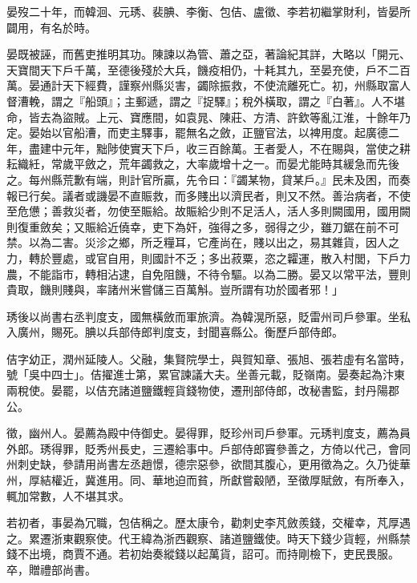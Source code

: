 \begin{pinyinscope}
 晏歿二十年，而韓洄、元琇、裴腆、李衡、包佶、盧徵、李若初繼掌財利，皆晏所闢用，有名於時。



 晏既被誣，而舊吏推明其功。陳諫以為管、蕭之亞，著論紀其詳，大略以「開元、天寶間天下戶千萬，至德後殘於大兵，饑疫相仍，十耗其九，至晏充使，戶不二百萬。晏通計天下經費，謹察州縣災害，蠲除振救，不使流離死亡。初，州縣取富人督漕輓，謂之『船頭』；主郵遞，謂之『捉驛』；稅外橫取，謂之『白著』。人不堪命，皆去為盜賊。上元、寶應間，如袁晁、陳莊、方清、許欽等亂江淮，十餘年乃定。晏始以官船漕，而吏主驛事，罷無名之斂，正鹽官法，以裨用度。起廣德二年，盡建中元年，黜陟使實天下戶，收三百餘萬。王者愛人，不在賜與，當使之耕耘織紝，常歲平斂之，荒年蠲救之，大率歲增十之一。而晏尤能時其緩急而先後之。每州縣荒歉有端，則計官所贏，先令曰：『蠲某物，貸某戶。』民未及困，而奏報已行矣。議者或譏晏不直賑救，而多賤出以濟民者，則又不然。善治病者，不使至危憊；善救災者，勿使至賑給。故賑給少則不足活人，活人多則闕國用，國用闕則復重斂矣；又賑給近僥幸，吏下為奸，強得之多，弱得之少，雖刀鋸在前不可禁。以為二害。災沴之鄉，所乏糧耳，它產尚在，賤以出之，易其雜貨，因人之力，轉於豐處，或官自用，則國計不乏；多出菽粟，恣之糶運，散入村閭，下戶力農，不能詣市，轉相沾逮，自免阻饑，不待令驅。以為二勝。晏又以常平法，豐則貴取，饑則賤與，率諸州米嘗儲三百萬斛。豈所謂有功於國者邪！」



 琇後以尚書右丞判度支，國無橫斂而軍旅濟。為韓滉所惡，貶雷州司戶參軍。坐私入廣州，賜死。腆以兵部侍郎判度支，封聞喜縣公。衡歷戶部侍郎。



 佶字幼正，潤州延陵人。父融，集賢院學士，與賀知章、張旭、張若虛有名當時，號「吳中四士」。佶擢進士第，累官諫議大夫。坐善元載，貶嶺南。晏奏起為汴東兩稅使。晏罷，以佶充諸道鹽鐵輕貨錢物使，遷刑部侍郎，改秘書監，封丹陽郡公。



 徵，幽州人。晏薦為殿中侍御史。晏得罪，貶珍州司戶參軍。元琇判度支，薦為員外郎。琇得罪，貶秀州長史，三遷給事中。戶部侍郎竇參善之，方倚以代己，會同州刺史缺，參請用尚書左丞趙憬，德宗惡參，欲間其腹心，更用徵為之。久乃徙華州，厚結權近，冀進用。同、華地迫而貧，所獻嘗觳陋，至徵厚賦斂，有所奉入，輒加常數，人不堪其求。



 若初者，事晏為冗職，包佶稱之。歷太康令，勸刺史李芃斂羨錢，交權幸，芃厚遇之。累遷浙東觀察使。代王緯為浙西觀察、諸道鹽鐵使。時天下錢少貨輕，州縣禁錢不出境，商賈不通。若初始奏縱錢以起萬貨，詔可。而持剛檢下，吏民畏服。卒，贈禮部尚書。




\end{pinyinscope}
